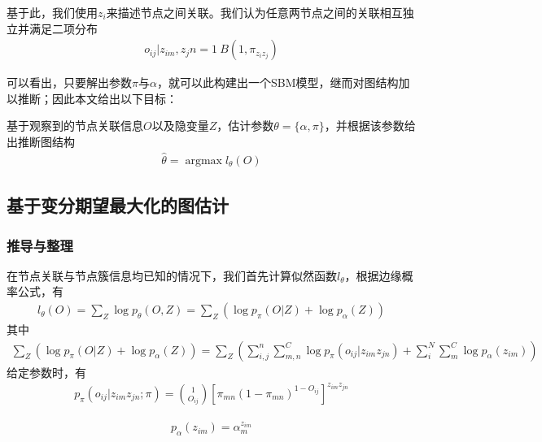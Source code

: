 基于此，我们使用$z_i$来描述节点之间关联。我们认为任意两节点之间的关联相互独立并满足二项分布 
\begin{equation}\begin{aligned}
    o_{ij}|z_{im},z_jn = 1 ~ B(1,\pi_{z_iz_j})
\end{aligned}\end{equation}


可以看出，只要解出参数$\pi$与$\alpha$，就可以此构建出一个SBM模型，继而对图结构加以推断；因此本文给出以下目标：

基于观察到的节点关联信息$O$以及隐变量$Z$，估计参数$\theta=\{\alpha,\pi\}$，并根据该参数给出推断图结构
\begin{equation}\begin{aligned}
    \hat{\theta}=\mathop{\arg\max} l_\theta(O)
\end{aligned}\end{equation}

\subsection{基于变分期望最大化的图估计}
\subsubsection{推导与整理}
在节点关联与节点簇信息均已知的情况下，我们首先计算似然函数$l_{\theta}$，根据边缘概率公式，有
\begin{equation}\begin{aligned}
    l_\theta(O)=\sum_{Z}\log p_\theta(O,Z)=\sum_Z(\log p_{\pi}(O|Z) +\log p_\alpha(Z))
\end{aligned}\end{equation}
其中 
\begin{equation}\begin{aligned}
\sum_Z(\log p_{\pi}(O|Z)+\log p_\alpha(Z))=\sum_Z(\sum_{i,j}^{n}\sum_{m,n}^C\log p_\pi(o_{ij}|z_{im}z_{jn})
+\sum_{i}^N\sum_m^C\log p_\alpha(z_{im}))
\end{aligned}\end{equation}
给定参数时，有 
\begin{equation}\begin{aligned}
p_\pi(o_{ij}|z_{im}z_{jn};\pi)=\binom{1}{O_{ij}}[\pi_{mn}(1-\pi_{mn})^{1-O_{ij}}]^{ z_{im}z_{jn}}
\end{aligned}\end{equation}

\begin{equation}\begin{aligned}
p_\alpha(z_{im})=\alpha_m^{z_{im}} 
\end{aligned}\end{equation}

